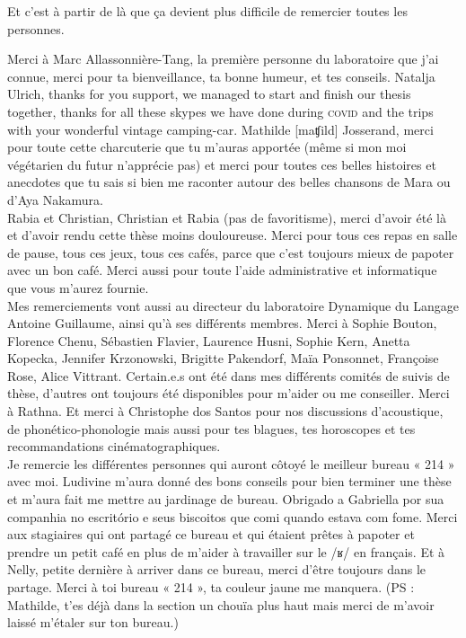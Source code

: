 Et c'est à partir de là que ça devient plus difficile de remercier toutes les personnes.

Merci à Marc Allassonnière-Tang, la première personne du laboratoire que j'ai connue, merci pour ta bienveillance, ta bonne humeur, et tes conseils.
Natalja Ulrich, thanks for you support, we managed to start and finish our thesis together, thanks for all these skypes we have done during \textsc{covid} and the trips with your wonderful vintage camping-car. 
Mathilde [maʧild] Josserand, merci pour toute cette charcuterie que tu m'auras apportée (même si mon moi végétarien du futur n'apprécie pas) et merci pour toutes ces belles histoires et anecdotes que tu sais si bien me raconter autour des belles chansons de Mara ou d'Aya Nakamura.\\

Rabia et Christian, Christian et Rabia (pas de favoritisme), merci d'avoir été là et d'avoir rendu cette thèse moins douloureuse. Merci pour tous ces repas en salle de pause, tous ces jeux, tous ces cafés, parce que c'est toujours mieux de papoter avec un bon café. Merci aussi pour toute l'aide administrative et informatique que vous m'aurez fournie. \\

Mes remerciements vont aussi au directeur du laboratoire Dynamique du Langage Antoine Guillaume, ainsi qu'à ses différents membres. Merci à Sophie Bouton, Florence Chenu, Sébastien Flavier, Laurence Husni, Sophie Kern, Anetta Kopecka, Jennifer Krzonowski, Brigitte Pakendorf, Maïa Ponsonnet, Françoise Rose, Alice Vittrant. Certain.e.s ont été dans mes différents comités de suivis de thèse, d'autres ont toujours été disponibles pour m'aider ou me conseiller. Merci à Rathna. Et merci à Christophe dos Santos pour nos discussions d'acoustique, de phonético-phonologie mais aussi pour tes blagues, tes horoscopes et tes recommandations cinématographiques.\\

Je remercie les différentes personnes qui auront côtoyé le meilleur bureau « 214 » avec moi. Ludivine m'aura donné des bons conseils pour bien terminer une thèse et m'aura fait me mettre au jardinage de bureau. Obrigado a Gabriella por sua companhia no escritório e seus biscoitos que comi quando estava com fome. Merci aux stagiaires qui ont partagé ce bureau et qui étaient prêtes à papoter et prendre un petit café en plus de m'aider à travailler sur le /ʁ/ en français. Et à Nelly, petite dernière à arriver dans ce bureau, merci d'être toujours dans le partage. Merci à toi bureau « 214 », ta couleur jaune me manquera. (PS : Mathilde, t'es déjà dans la section un chouïa plus haut mais merci de m'avoir laissé m'étaler sur ton bureau.)\\

